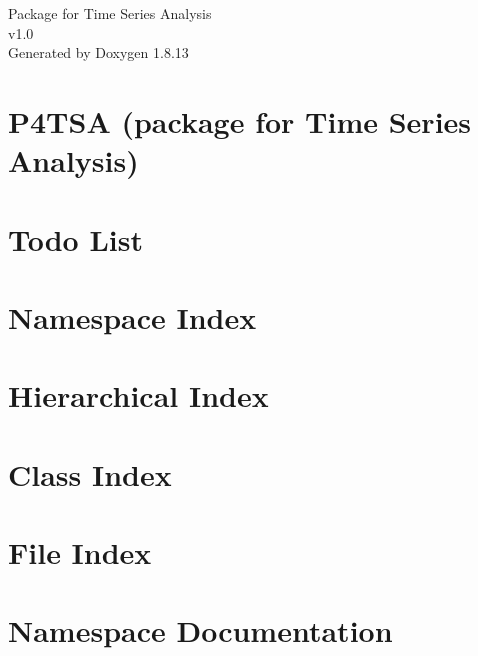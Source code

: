 \documentclass[twoside]{book}
\newcommand{\+}{\discretionary{\mbox{\scriptsize$\hookleftarrow$}}{}{}}
\newcommand{\clearemptydoublepage}{%
  \newpage{\pagestyle{empty}\cleardoublepage}%
}
\begin{document}
\hypersetup{pageanchor=false,
             bookmarksnumbered=true,
             pdfencoding=unicode
            }
\begin{titlepage}
\vspace*{7cm}
\begin{center}%
{\Large Package for Time Series Analysis \\[1ex]\large v1.\+0 }\\
\vspace*{1cm}
{\large Generated by Doxygen 1.8.13}\\
\end{center}
\end{titlepage}
\clearemptydoublepage
{}
\tableofcontents
\clearemptydoublepage
{}
\hypersetup{pageanchor=true}

\chapter{P4\+T\+SA (package for Time Series Analysis)}
\label{index}\hypertarget{index}{}
\chapter{Todo List}
\label{todo}

\chapter{Namespace Index}

\chapter{Hierarchical Index}

\chapter{Class Index}

\chapter{File Index}

\chapter{Namespace Documentation}



\end{document}
